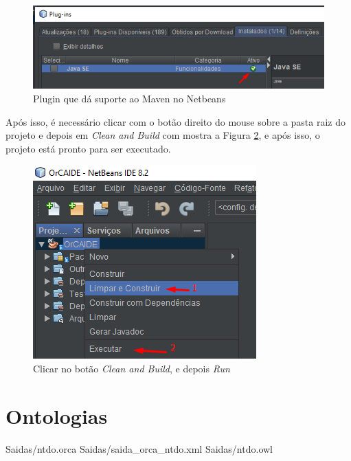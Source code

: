 \documentclass{bcc}
\begin{document}
\begin{figure}[H]
\centering
\includegraphics[width=.9\textwidth]{Figuras/install5.png}
\caption{Plugin que dá suporte ao Maven no Netbeans} 
\label{fig:install5}
\end{figure}

Após isso, é necessário clicar com o botão direito do mouse sobre a pasta raiz do projeto e depois em \textit{Clean and Build} com mostra a Figura \ref{fig:install6}, e após isso, o projeto está pronto para ser executado.

\begin{figure}[H]
\centering
\includegraphics[width=.6\textwidth]{Figuras/install6.png}
\caption{Clicar no botão \textit{Clean and Build}, e depois \textit{Run}} 
\label{fig:install6}
\end{figure}

\chapter{Ontologias} 
\label{chap:apOntologia}
 {Saidas/ntdo.orca}
 {Saidas/saida_orca_ntdo.xml}
 {Saidas/ntdo.owl}
\end{document}
